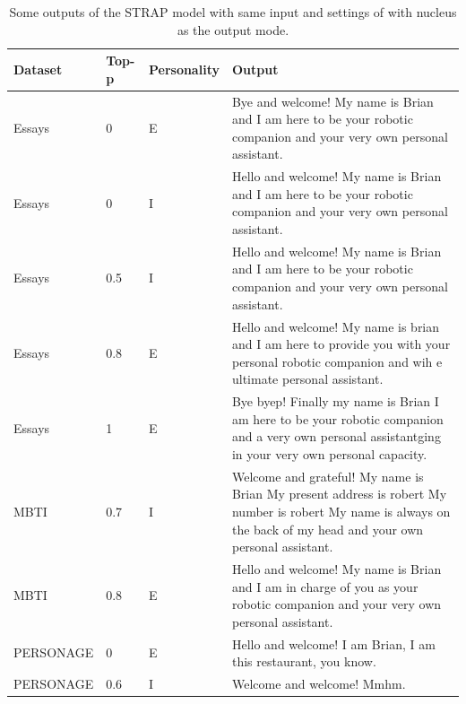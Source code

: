 \documentclass[nomenclature, english, biblatex]{kththesis}
\begin{document}
\begin{table}
    \centering
    \begin{adjustbox}{max width=\textwidth}
        \begin{tabular}{|p{}|p{}|p{}|p{}|}
        \hline
        Dataset & Top-p & Personality & Output \\
        \hline
        \hline
        Essays & 0 & E & Bye and welcome! My name is Brian and I am here to be your robotic companion and your very own personal assistant.\\
        \hline
        Essays & 0 & I & Hello and welcome! My name is Brian and I am here to be your robotic companion and your very own personal assistant.\\
        \hline
        Essays & 0.5 & I & Hello and welcome! My name is Brian and I am here to be your robotic companion and your very own personal assistant.\\
        \hline
        Essays & 0.8 & E & Hello and welcome! My name is brian and I am here to provide you with your personal robotic companion and wih e ultimate personal assistant.\\
        \hline
        Essays & 1 & E & Bye byep! Finally my name is Brian I am here to be your robotic companion and a very own personal assistantging in your very own personal capacity.\\
        \hline
        MBTI & 0.7 & I & Welcome and grateful! My name is Brian My present address is robert My number is robert My name is always on the back of my head and your own personal assistant.\\
        \hline
        MBTI & 0.8 & E & Hello and welcome! My name is Brian and I am in charge of you as your robotic companion and your very own personal assistant.\\
        \hline
        PERSONAGE & 0 & E & Hello and welcome! I am Brian, I am this restaurant, you know.\\
        \hline
        PERSONAGE & 0.6 & I & Welcome and welcome! Mmhm.\\
        \hline
        \end{tabular}
    \end{adjustbox}
    \caption{Some outputs of the STRAP model with same input and settings of  with nucleus as the output mode.}
    \label{tab:strap_n_results}
\end{table}
\end{document}
